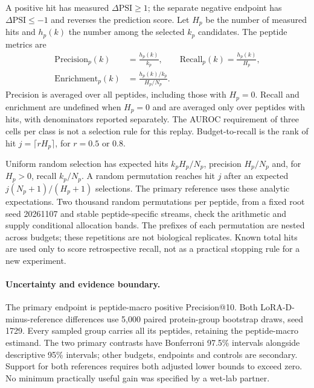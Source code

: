 A positive hit has measured $\Delta\mathrm{PSI}\ge1$; the separate negative endpoint has
$\Delta\mathrm{PSI}\le-1$ and reverses the prediction score. Let $H_p$ be the number of measured
hits and $h_p(k)$ the number among the selected $k_p$ candidates. The peptide metrics are
\begin{equation}
  \begin{aligned}
    \mathrm{Precision}_p(k)&=\frac{h_p(k)}{k_p},\qquad
    \mathrm{Recall}_p(k)=\frac{h_p(k)}{H_p},\\
    \mathrm{Enrichment}_p(k)&=\frac{h_p(k)/k_p}{H_p/N_p}.
  \end{aligned}
\end{equation}
Precision is averaged over all peptides, including those with $H_p=0$. Recall and enrichment
are undefined when $H_p=0$ and are averaged only over peptides with hits, with denominators
reported separately. The AUROC requirement of three cells per class is not a selection rule for
this replay. Budget-to-recall is the rank of hit $j=\lceil rH_p\rceil$, for $r=0.5$ or $0.8$.

Uniform random selection has expected hits $k_pH_p/N_p$, precision $H_p/N_p$ and, for $H_p>0$,
recall $k_p/N_p$. A random permutation reaches hit $j$ after an expected
$j(N_p+1)/(H_p+1)$ selections. The primary reference uses these analytic expectations.
Two thousand random permutations per peptide, from a fixed root seed 20261107 and stable
peptide-specific streams, check the arithmetic and supply conditional allocation bands.
The prefixes of each permutation are nested across budgets; these repetitions are not biological
replicates. Known total hits are used only to score retrospective recall, not as a practical
stopping rule for a new experiment.

\paragraph{Uncertainty and evidence boundary.}
The primary endpoint is peptide-macro positive Precision@10. Both LoRA-D-minus-reference
differences use 5,000 paired protein-group bootstrap draws, seed 1729. Every sampled group carries
all its peptides, retaining the peptide-macro estimand. The two primary contrasts have Bonferroni
97.5\% intervals alongside descriptive 95\% intervals; other budgets, endpoints and controls are
secondary. Support for both references requires both adjusted lower bounds to exceed zero.
No minimum practically useful gain was specified by a wet-lab partner.


